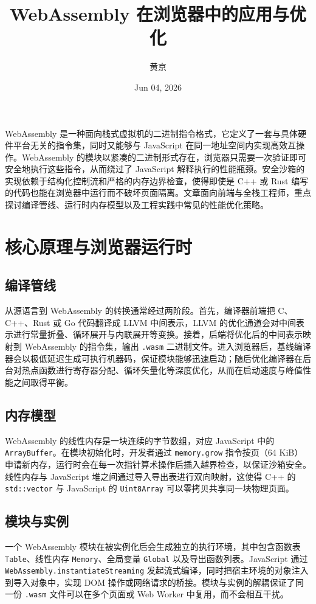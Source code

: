 \title{WebAssembly 在浏览器中的应用与优化}
\author{黄京}
\date{Jun 04, 2026}
\maketitle
WebAssembly 是一种面向栈式虚拟机的二进制指令格式，它定义了一套与具体硬件平台无关的指令集，同时又能够与 JavaScript 在同一地址空间内实现高效互操作。WebAssembly 的模块以紧凑的二进制形式存在，浏览器只需要一次验证即可安全地执行这些指令，从而绕过了 JavaScript 解释执行的性能瓶颈。安全沙箱的实现依赖于结构化控制流和严格的内存边界检查，使得即使是 C++ 或 Rust 编写的代码也能在浏览器中运行而不破坏页面隔离。文章面向前端与全栈工程师，重点探讨编译管线、运行时内存模型以及工程实践中常见的性能优化策略。\par
\chapter{核心原理与浏览器运行时}
\section{编译管线}
从源语言到 WebAssembly 的转换通常经过两阶段。首先，编译器前端把 C、C++、Rust 或 Go 代码翻译成 LLVM 中间表示，LLVM 的优化通道会对中间表示进行常量折叠、循环展开与内联展开等变换。接着，后端将优化后的中间表示映射到 WebAssembly 的指令集，输出 \texttt{.wasm} 二进制文件。进入浏览器后，基线编译器会以极低延迟生成可执行机器码，保证模块能够迅速启动；随后优化编译器在后台对热点函数进行寄存器分配、循环矢量化等深度优化，从而在启动速度与峰值性能之间取得平衡。\par
\section{内存模型}
WebAssembly 的线性内存是一块连续的字节数组，对应 JavaScript 中的 \texttt{ArrayBuffer}。在模块初始化时，开发者通过 \texttt{memory.grow} 指令按页（64 KiB）申请新内存，运行时会在每一次指针算术操作后插入越界检查，以保证沙箱安全。线性内存与 JavaScript 堆之间通过导入导出表进行双向映射，这使得 C++ 的 \texttt{std::vector} 与 JavaScript 的 \texttt{Uint8Array} 可以零拷贝共享同一块物理页面。\par
\section{模块与实例}
一个 WebAssembly 模块在被实例化后会生成独立的执行环境，其中包含函数表 \texttt{Table}、线性内存 \texttt{Memory}、全局变量 \texttt{Global} 以及导出函数列表。JavaScript 通过 \texttt{WebAssembly.instantiateStreaming} 发起流式编译，同时把宿主环境的对象注入到导入对象中，实现 DOM 操作或网络请求的桥接。模块与实例的解耦保证了同一份 \texttt{.wasm} 文件可以在多个页面或 Web Worker 中复用，而不会相互干扰。\par
